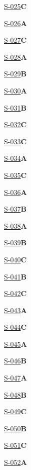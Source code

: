 \noindent\hyperref[q:S-025]{S-025}\hfill\textbf{C}\par
\noindent\hyperref[q:S-026]{S-026}\hfill\textbf{A}\par
\noindent\hyperref[q:S-027]{S-027}\hfill\textbf{C}\par
\noindent\hyperref[q:S-028]{S-028}\hfill\textbf{A}\par
\noindent\hyperref[q:S-029]{S-029}\hfill\textbf{B}\par
\noindent\hyperref[q:S-030]{S-030}\hfill\textbf{A}\par
\noindent\hyperref[q:S-031]{S-031}\hfill\textbf{B}\par
\noindent\hyperref[q:S-032]{S-032}\hfill\textbf{C}\par
\noindent\hyperref[q:S-033]{S-033}\hfill\textbf{C}\par
\noindent\hyperref[q:S-034]{S-034}\hfill\textbf{A}\par
\noindent\hyperref[q:S-035]{S-035}\hfill\textbf{C}\par
\noindent\hyperref[q:S-036]{S-036}\hfill\textbf{A}\par
\noindent\hyperref[q:S-037]{S-037}\hfill\textbf{B}\par
\noindent\hyperref[q:S-038]{S-038}\hfill\textbf{A}\par
\noindent\hyperref[q:S-039]{S-039}\hfill\textbf{B}\par
\noindent\hyperref[q:S-040]{S-040}\hfill\textbf{C}\par
\noindent\hyperref[q:S-041]{S-041}\hfill\textbf{B}\par
\noindent\hyperref[q:S-042]{S-042}\hfill\textbf{C}\par
\noindent\hyperref[q:S-043]{S-043}\hfill\textbf{A}\par
\noindent\hyperref[q:S-044]{S-044}\hfill\textbf{C}\par
\noindent\hyperref[q:S-045]{S-045}\hfill\textbf{A}\par
\noindent\hyperref[q:S-046]{S-046}\hfill\textbf{B}\par
\noindent\hyperref[q:S-047]{S-047}\hfill\textbf{A}\par
\noindent\hyperref[q:S-048]{S-048}\hfill\textbf{B}\par
\noindent\hyperref[q:S-049]{S-049}\hfill\textbf{C}\par
\noindent\hyperref[q:S-050]{S-050}\hfill\textbf{B}\par
\noindent\hyperref[q:S-051]{S-051}\hfill\textbf{C}\par
\noindent\hyperref[q:S-052]{S-052}\hfill\textbf{A}\par
